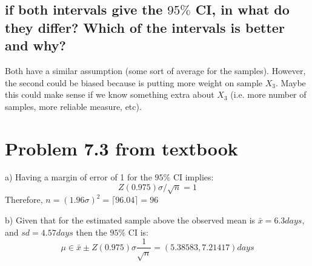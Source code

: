 \documentclass[10pt]{article}
\begin{document}
\subsection{if both intervals give the $95\%$ CI, in what do they differ? Which of the intervals is better and why?}
Both have a similar assumption (some sort of average for the samples). However, the second could be biased because is putting more weight on
sample $X_3$. Maybe this could make sense if we know something extra about $X_3$ (i.e. more number of samples, more reliable measure, etc).

\section{Problem 7.3 from textbook}

a) Having a margin of error of 1 for the $95\%$ CI implies:
  \[
    Z(0.975) \sigma/\sqrt{n} = 1
  \]
  Therefore, $n = (1.96\sigma)^2 = \lceil96.04\rceil=96$

b) Given that for the estimated sample above the observed mean is $\bar{x}=6.3days$, and $sd = 4.57days$ then the $95\%$ CI is:
  \[
   \mu \in \bar{x} \pm Z(0.975) \sigma\frac{1}{\sqrt{n}} = (5.38583, 7.21417)days
  \]
\end{document}
